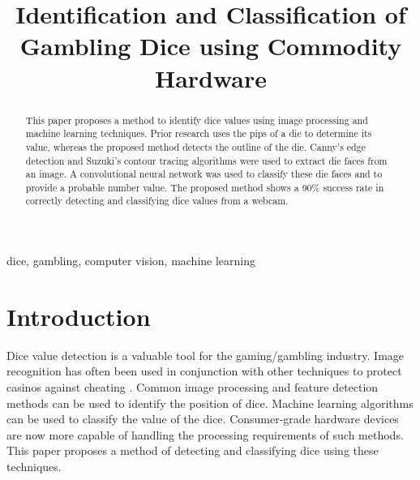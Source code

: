 \documentclass[conference]{IEEEtran}
\begin{document}
\title{
	Identification and Classification of Gambling Dice using Commodity Hardware
}

\author{
	\and
}

\maketitle

\begin{abstract}
	This paper proposes a method to identify dice values using image processing and machine learning techniques.
	Prior research uses the pips of a die to determine its value, whereas the proposed method detects the outline of the die.
	Canny's edge detection and Suzuki's contour tracing algorithms were used to extract die faces from an image.
	A convolutional neural network was used to classify these die faces and to provide a probable number value.
	The proposed method shows a 90\% success rate in correctly detecting and classifying dice values from a webcam.
\end{abstract}

\begin{IEEEkeywords}
	dice, gambling, computer vision, machine learning
\end{IEEEkeywords}

\section{Introduction}

Dice value detection is a valuable tool for the gaming/gambling industry.
Image recognition has often been used in conjunction with other techniques to protect casinos against cheating \cite{4129523}\cite{Correia1995}.
Common image processing and feature detection methods can be used to identify the position of dice.
Machine learning algorithms can be used to classify the value of the dice.
Consumer-grade hardware devices are now more capable of handling the processing requirements of such methods.
This paper proposes a method of detecting and classifying dice using these techniques.
\end{document}
